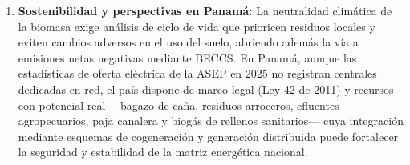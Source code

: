 \begin{enumerate}[leftmargin=1.5em]
\item \textbf{Sostenibilidad y perspectivas en Panamá:} La neutralidad climática de la biomasa exige análisis de ciclo de vida que prioricen residuos locales y eviten cambios adversos en el uso del suelo, abriendo además la vía a emisiones netas negativas mediante BECCS. En Panamá, aunque las estadísticas de oferta eléctrica de la ASEP en 2025 no registran centrales dedicadas en red, el país dispone de marco legal (Ley 42 de 2011) y recursos con potencial real ---bagazo de caña, residuos arroceros, efluentes agropecuarios, paja canalera y biogás de rellenos sanitarios--- cuya integración mediante esquemas de cogeneración y generación distribuida puede fortalecer la seguridad y estabilidad de la matriz energética nacional.
\end{enumerate}
